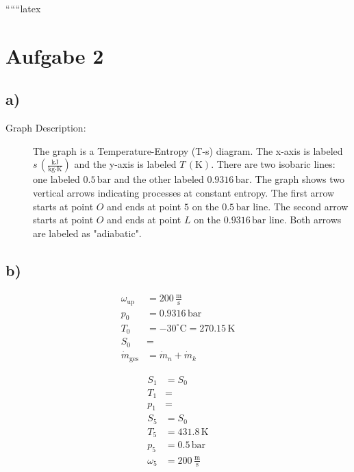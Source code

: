 
``````latex


\section*{Aufgabe 2}

\subsection*{a)}

\begin{description}
    \item[Graph Description:] The graph is a Temperature-Entropy (T-s) diagram. The x-axis is labeled \( s \, (\frac{\text{kJ}}{\text{kg} \cdot \text{K}}) \) and the y-axis is labeled \( T \, (\text{K}) \). There are two isobaric lines: one labeled \( 0.5 \, \text{bar} \) and the other labeled \( 0.9316 \, \text{bar} \). The graph shows two vertical arrows indicating processes at constant entropy. The first arrow starts at point \( O \) and ends at point \( 5 \) on the \( 0.5 \, \text{bar} \) line. The second arrow starts at point \( O \) and ends at point \( L \) on the \( 0.9316 \, \text{bar} \) line. Both arrows are labeled as "adiabatic".
\end{description}

\subsection*{b)}

\begin{align*}
    \omega_{\text{up}} &= 200 \, \frac{\text{m}}{\text{s}} \\
    p_0 &= 0.9316 \, \text{bar} \\
    T_0 &= -30^\circ \text{C} = 270.15 \, \text{K} \\
    S_0 &= \\
    \dot{m}_{\text{ges}} &= \dot{m}_n + \dot{m}_k
\end{align*}

\begin{align*}
    S_1 &= S_0 \\
    T_1 &= \\
    p_1 &= \\
    S_5 &= S_0 \\
    T_5 &= 431.8 \, \text{K} \\
    p_5 &= 0.5 \, \text{bar} \\
    \omega_5 &= 200 \, \frac{\text{m}}{\text{s}}
\end{align*}

